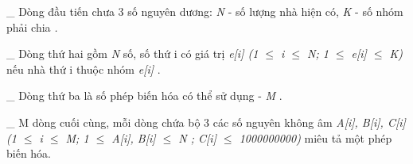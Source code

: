 \_ Dòng đầu tiến chưa 3 số nguyên dương:   \emph{    N   }   - số lượng nhà hiện có,   \emph{    K   }   - số nhóm phải chia   \emph{    .   }

   \_ Dòng thứ hai gồm   \emph{    N   }   số, số thứ i có giá trị   \emph{    e[i] (1  $\le$  i  $\le$  N; 1  $\le$  e[i]  $\le$  K)   }   nếu nhà thứ i thuộc nhóm   \emph{    e[i]   }   .  

   \_ Dòng thứ ba là số phép biến hóa có thể sử dụng -   \emph{    M   }   .  

   \_ M dòng cuối cùng, mỗi dòng chứa bộ 3 các số nguyên không âm   \emph{    A[i], B[i], C[i] (1  $\le$  i  $\le$  M; 1  $\le$  A[i], B[i]  $\le$  N ; C[i]  $\le$  1000000000)   }   miêu tả một phép biến hóa.  

\